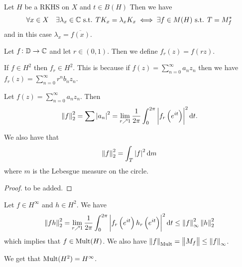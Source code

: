 \documentclass[11pt,a4paper]{article}
\begin{document}
\begin{proposition}
  Let $H$ be a RKHS on $X$ and $t \in B(H)$
  Then we have 
  \[
    \forall x \in X \quad \exists \lambda_x \in \mathbb{C} \text{ s.t. } T K_x = \lambda_x K_x
    \iff
    \exists f \in M(H) \text{ s.t. } T = M^*_{f}
  \]
  and in this case $\lambda_x = \overline{f(x)}$.
\end{proposition}

\begin{definition}
  Let $f \colon \mathbb{D} \to \mathbb{C}$ and let $r \in (0,1)$.
  Then we define $f_r(z) = f(rz)$.
\end{definition}
\begin{remark}
  If $f \in H^2$ then $f_r \in H^2$.
  This is because if $f(z) = \sum_{n=0}^{\infty} a_n z_n$
  then we have $f_r(z) = \sum_{n=0}^{\infty} r^n b_n z_n$. %
\end{remark}

\begin{proposition}
  Let $f(z) = \sum_{n=0}^{\infty} a_n z_n$.
  Then
  \[
    \norm{f}_{2}^{2} =
    \sum \abs{a_n}^2 =
    \lim_{r \nearrow 1}
    \frac{1}{2\pi} \int_{0}^{2\pi} \abs{f_r\del{e^{it}}}^2 \dt.
  \]
\end{proposition}
\begin{remark}
  We also have that
  \[
    \left\lVert f\right\rVert_{2}^{2} =
    \int_{T} \left\lvert f\right\rvert^2 \mathrm{d} m
  \]
  where $m$ is the Lebesgue measure on the circle.
\end{remark}
\begin{proof}
  to be added.  
\end{proof}

\begin{proposition}
  Let $f \in H^{\infty}$ and $h \in H^2$.
  We have
  \[
    \norm{f h}_{2}^{2} =
    \lim_{r \nearrow 1}
    \frac{1}{2\pi}
    \int_{0}^{2\pi} \abs{f_r\del{e^{it}} h_r\del{e^{it}}}^2 \dt \le
    \norm{f}^2_{\infty} \norm{h}_{2}^{2}
  \]
  which implies that $f \in \operatorname{Mult}(H)$.
  We also have $\left\lVert f\right\rVert_{\operatorname{Mult}} = \left\lVert M_f\right\rVert \le \left\lVert f\right\rVert_{\infty}$.
\end{proposition}
\begin{corollary}
  We get that $\operatorname{Mult}(H^2) = H^{\infty}$.
\end{corollary}
\end{document}
